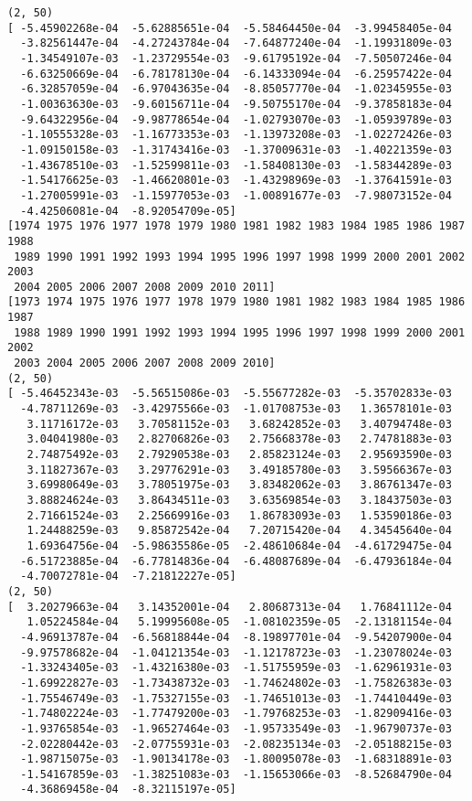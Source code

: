 \documentclass[11pt]{article}
\begin{document}
\begin{Verbatim}[commandchars=\\\{\}]
(2, 50)
[ -5.45902268e-04  -5.62885651e-04  -5.58464450e-04  -3.99458405e-04
  -3.82561447e-04  -4.27243784e-04  -7.64877240e-04  -1.19931809e-03
  -1.34549107e-03  -1.23729554e-03  -9.61795192e-04  -7.50507246e-04
  -6.63250669e-04  -6.78178130e-04  -6.14333094e-04  -6.25957422e-04
  -6.32857059e-04  -6.97043635e-04  -8.85057770e-04  -1.02345955e-03
  -1.00363630e-03  -9.60156711e-04  -9.50755170e-04  -9.37858183e-04
  -9.64322956e-04  -9.98778654e-04  -1.02793070e-03  -1.05939789e-03
  -1.10555328e-03  -1.16773353e-03  -1.13973208e-03  -1.02272426e-03
  -1.09150158e-03  -1.31743416e-03  -1.37009631e-03  -1.40221359e-03
  -1.43678510e-03  -1.52599811e-03  -1.58408130e-03  -1.58344289e-03
  -1.54176625e-03  -1.46620801e-03  -1.43298969e-03  -1.37641591e-03
  -1.27005991e-03  -1.15977053e-03  -1.00891677e-03  -7.98073152e-04
  -4.42506081e-04  -8.92054709e-05]
[1974 1975 1976 1977 1978 1979 1980 1981 1982 1983 1984 1985 1986 1987 1988
 1989 1990 1991 1992 1993 1994 1995 1996 1997 1998 1999 2000 2001 2002 2003
 2004 2005 2006 2007 2008 2009 2010 2011]
[1973 1974 1975 1976 1977 1978 1979 1980 1981 1982 1983 1984 1985 1986 1987
 1988 1989 1990 1991 1992 1993 1994 1995 1996 1997 1998 1999 2000 2001 2002
 2003 2004 2005 2006 2007 2008 2009 2010]
(2, 50)
[ -5.46452343e-03  -5.56515086e-03  -5.55677282e-03  -5.35702833e-03
  -4.78711269e-03  -3.42975566e-03  -1.01708753e-03   1.36578101e-03
   3.11716172e-03   3.70581152e-03   3.68242852e-03   3.40794748e-03
   3.04041980e-03   2.82706826e-03   2.75668378e-03   2.74781883e-03
   2.74875492e-03   2.79290538e-03   2.85823124e-03   2.95693590e-03
   3.11827367e-03   3.29776291e-03   3.49185780e-03   3.59566367e-03
   3.69980649e-03   3.78051975e-03   3.83482062e-03   3.86761347e-03
   3.88824624e-03   3.86434511e-03   3.63569854e-03   3.18437503e-03
   2.71661524e-03   2.25669916e-03   1.86783093e-03   1.53590186e-03
   1.24488259e-03   9.85872542e-04   7.20715420e-04   4.34545640e-04
   1.69364756e-04  -5.98635586e-05  -2.48610684e-04  -4.61729475e-04
  -6.51723885e-04  -6.77814836e-04  -6.48087689e-04  -6.47936184e-04
  -4.70072781e-04  -7.21812227e-05]
(2, 50)
[  3.20279663e-04   3.14352001e-04   2.80687313e-04   1.76841112e-04
   1.05224584e-04   5.19995608e-05  -1.08102359e-05  -2.13181154e-04
  -4.96913787e-04  -6.56818844e-04  -8.19897701e-04  -9.54207900e-04
  -9.97578682e-04  -1.04121354e-03  -1.12178723e-03  -1.23078024e-03
  -1.33243405e-03  -1.43216380e-03  -1.51755959e-03  -1.62961931e-03
  -1.69922827e-03  -1.73438732e-03  -1.74624802e-03  -1.75826383e-03
  -1.75546749e-03  -1.75327155e-03  -1.74651013e-03  -1.74410449e-03
  -1.74802224e-03  -1.77479200e-03  -1.79768253e-03  -1.82909416e-03
  -1.93765854e-03  -1.96527464e-03  -1.95733549e-03  -1.96790737e-03
  -2.02280442e-03  -2.07755931e-03  -2.08235134e-03  -2.05188215e-03
  -1.98715075e-03  -1.90134178e-03  -1.80095078e-03  -1.68318891e-03
  -1.54167859e-03  -1.38251083e-03  -1.15653066e-03  -8.52684790e-04
  -4.36869458e-04  -8.32115197e-05]

    \end{Verbatim}
\end{document}

